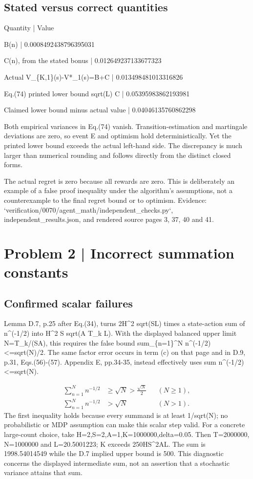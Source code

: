 \documentclass[10pt]{article}
\begin{document}
\subsection*{Stated versus correct quantities}
Quantity | Value\par
B(n) | 0.0008492438796395031\par
C(n), from the stated bonus | 0.012649237133677323\par
Actual V\_\{K,1\}(s)-V*\_1(s)=B+C | 0.013498481013316826\par
Eq.(74) printed lower bound sqrt(L) C | 0.05395983862193981\par
Claimed lower bound minus actual value | 0.04046135760862298\par
Both empirical variances in Eq.(74) vanish. Transition-estimation and martingale deviations are zero, so event E and optimism hold deterministically. Yet the printed lower bound exceeds the actual left-hand side. The discrepancy is much larger than numerical rounding and follows directly from the distinct closed forms.\par
The actual regret is zero because all rewards are zero. This is deliberately an example of a false proof inequality under the algorithm’s assumptions, not a counterexample to the final regret bound or to optimism. Evidence: `verification/0070/agent\_math/independent\_checks.py`, independent\_results.json, and rendered source pages 3, 37, 40 and 41.\par
\section*{Problem 2 | Incorrect summation constants}
\subsection*{Confirmed scalar failures}
Lemma D.7, p.25 after Eq.(34), turns 2H\textasciicircum{}2 sqrt(SL) times a state-action sum of n\textasciicircum{}(-1/2) into H\textasciicircum{}2 S sqrt(A T\_k L). With the displayed balanced upper limit N=T\_k/(SA), this requires the false bound sum\_\{n=1\}\textasciicircum{}N n\textasciicircum{}(-1/2)<=sqrt(N)/2. The same factor error occurs in term (c) on that page and in D.9, p.31, Eqs.(56)-(57). Appendix E, pp.34-35, instead effectively uses sum n\textasciicircum{}(-1/2)<=sqrt(N).\par
\[\begin{aligned}\sum_{n=1}^N n^{-1/2}&\ge\sqrt N>\frac{\sqrt N}{2}&& (N\ge1),\\ \sum_{n=1}^N n^{-1/2}&>\sqrt N&& (N>1).\end{aligned}\] The first inequality holds because every summand is at least 1/sqrt(N); no probabilistic or MDP assumption can make this scalar step valid. For a concrete large-count choice, take H=2,S=2,A=1,K=1000000,delta=0.05. Then T=2000000, N=1000000 and L=20.5001223; K exceeds 250HS\textasciicircum{}2AL. The sum is 1998.54014549 while the D.7 implied upper bound is 500. This diagnostic concerns the displayed intermediate sum, not an assertion that a stochastic variance attains that sum.\par
\end{document}
